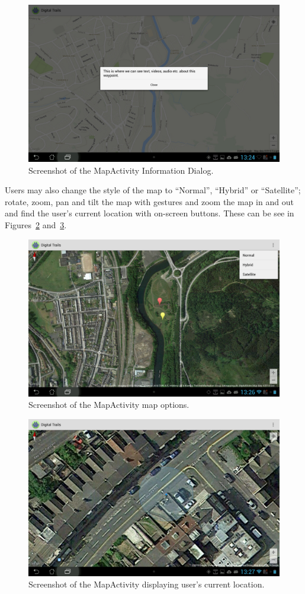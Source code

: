 \documentclass[11pt,a4paper]{article}
\begin{document}
\begin{figure}[H]
\centering
\includegraphics[width=.7\linewidth]{wpInfoDialog.jpg}
\caption{Screenshot of the MapActivity Information Dialog.}
\label{fig:wpInfoDialog}
\end{figure}

Users may also change the style of the map to ``Normal'', ``Hybrid'' or ``Satellite''; rotate, zoom, pan and tilt the map with gestures and zoom the map in and out and find the user's current location with on-screen buttons. These can be see in Figures~\ref{fig:mapOptions} and~\ref{fig:userLocation}.

\begin{figure}[H]
\centering
\includegraphics[width=.7\linewidth]{mapOptions.jpg}
\caption{Screenshot of the MapActivity map options.}
\label{fig:mapOptions}
\end{figure}

\begin{figure}[H]
\centering
\includegraphics[width=.7\linewidth]{userLocation.jpg}
\caption{Screenshot of the MapActivity displaying user's current location.}
\label{fig:userLocation}
\end{figure}
\end{document}
